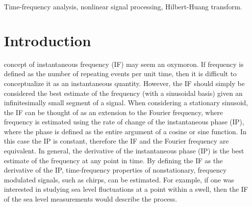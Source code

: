 \documentclass[a4paper]{IEEEtran}
\begin{document}
\begin{IEEEkeywords}
Time-frequency analysis, nonlinear signal processing, Hilbert-Huang transform.
\end{IEEEkeywords}

\IEEEpeerreviewmaketitle

\section{Introduction}
 concept of instantaneous frequency (IF) may seem an oxymoron. If frequency is defined as the number of repeating events per unit time, then it is difficult to conceptualize it as an instantaneous quantity. However, the IF should simply be considered the best estimate of the frequency (with a sinusoidal basis) given an infinitesimally small segment of a signal. When considering a stationary sinusoid, the IF can be thought of as an extension to the Fourier frequency, where frequency is estimated using the rate of change of the instantaneous phase (IP), where the phase is defined as the entire argument of a cosine or sine function. In this case the IP is constant, therefore the IF and the Fourier frequency are equivalent. In general, the derivative of the instantaneous phase (IP) is the best estimate of the frequency at any point in time. By defining the IF as the derivative of the IP, time-frequency properties of nonstationary, frequency modulated signals, such as chirps, can be estimated. For example, if one was interested in studying sea level fluctuations at a point within a swell, then the IF of the sea level measurements would describe the process. 
\end{document}
